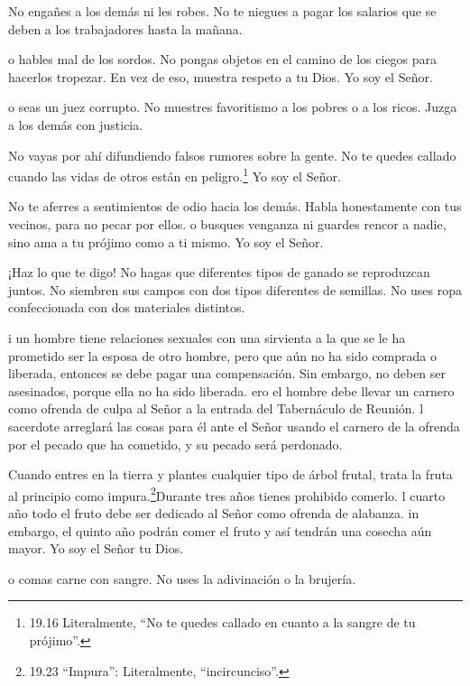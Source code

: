  No engañes a los demás ni les robes. No te niegues a pagar
los salarios que se deben a los trabajadores hasta la mañana.

 o hables mal de los sordos. No pongas objetos en el camino
de los ciegos para hacerlos tropezar. En vez de eso, muestra respeto a
tu Dios. Yo soy el Señor.

 o seas un juez corrupto. No muestres favoritismo a los
pobres o a los ricos. Juzga a los demás con justicia.

 No vayas por ahí difundiendo falsos rumores sobre la
gente. No te quedes callado cuando las vidas de otros están en
peligro.\footnote{19.16 Literalmente, ``No te quedes callado en cuanto a
  la sangre de tu prójimo''.} Yo soy el Señor.

 No te aferres a sentimientos de odio hacia los demás.
Habla honestamente con tus vecinos, para no pecar por ellos.
 o busques venganza ni guardes rencor a nadie, sino ama a
tu prójimo como a ti mismo. Yo soy el Señor.

 ¡Haz lo que te digo! No hagas que diferentes tipos de
ganado se reproduzcan juntos. No siembren sus campos con dos tipos
diferentes de semillas. No uses ropa confeccionada con dos materiales
distintos.

 i un hombre tiene relaciones sexuales con una sirvienta a
la que se le ha prometido ser la esposa de otro hombre, pero que aún no
ha sido comprada o liberada, entonces se debe pagar una compensación.
Sin embargo, no deben ser asesinados, porque ella no ha sido liberada.
 ero el hombre debe llevar un carnero como ofrenda de culpa
al Señor a la entrada del Tabernáculo de Reunión.  l
sacerdote arreglará las cosas para él ante el Señor usando el carnero de
la ofrenda por el pecado que ha cometido, y su pecado será perdonado.

 Cuando entres en la tierra y plantes cualquier tipo de
árbol frutal, trata la fruta al principio como impura.\footnote{19.23
  ``Impura'': Literalmente, ``incircunciso''.}Durante tres años tienes
prohibido comerlo.  l cuarto año todo el fruto debe ser
dedicado al Señor como ofrenda de alabanza.  in embargo, el
quinto año podrán comer el fruto y así tendrán una cosecha aún mayor. Yo
soy el Señor tu Dios.

 o comas carne con sangre. No uses la adivinación o la
brujería.

